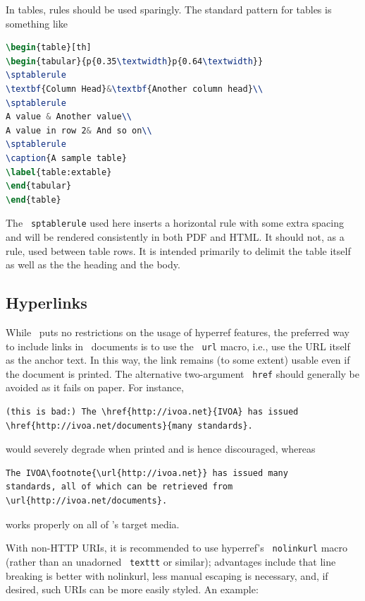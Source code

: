 \documentclass[11pt,a4paper]{ivoa}
\newcommand{\texword}[1]{\texttt{\color{texcolor} #1}}
\begin{document}
In tables, rules should be used sparingly.  The standard pattern for tables is
something like
\begin{lstlisting}[language=tex]
\begin{table}[th]
\begin{tabular}{p{0.35\textwidth}p{0.64\textwidth}}
\sptablerule
\textbf{Column Head}&\textbf{Another column head}\\
\sptablerule
A value & Another value\\
A value in row 2& And so on\\
\sptablerule
\caption{A sample table}
\label{table:extable}
\end{tabular}
\end{table}
\end{lstlisting}

The \texword{sptablerule} used here inserts a horizontal rule with some
extra spacing and will be rendered consistently in both PDF and HTML.
It should not, as a rule, used between table rows. It is intended
primarily to delimit the table itself as well as the the heading and the
body.

\subsection{Hyperlinks}
\label{sect:links}

While \ivoatex\ puts no restrictions on the usage of hyperref features,
the preferred way to include links in \ivoatex\ documents is to use the
\texword{url} macro, i.e., use the URL itself as the anchor text.  In
this way, the link remains (to some extent) usable even if the document
is printed.  The alternative two-argument \texword{href} should
generally be avoided as it fails on paper.  For instance,
\begin{lstlisting}
(this is bad:) The \href{http://ivoa.net}{IVOA} has issued
\href{http://ivoa.net/documents}{many standards}.
\end{lstlisting}
would severely degrade when printed and is hence discouraged, whereas
\begin{lstlisting}
The IVOA\footnote{\url{http://ivoa.net}} has issued many
standards, all of which can be retrieved from
\url{http://ivoa.net/documents}.
\end{lstlisting}
works properly on all of \ivoatex's target media.

With non-HTTP URIs, it is recommended to use hyperref's
\texword{nolinkurl} macro (rather than an unadorned \texword{texttt} or
similar); advantages include that line breaking is better with
nolinkurl, less manual escaping is necessary, and, if desired,
such URIs can be more easily styled.  An example:
\end{document}
